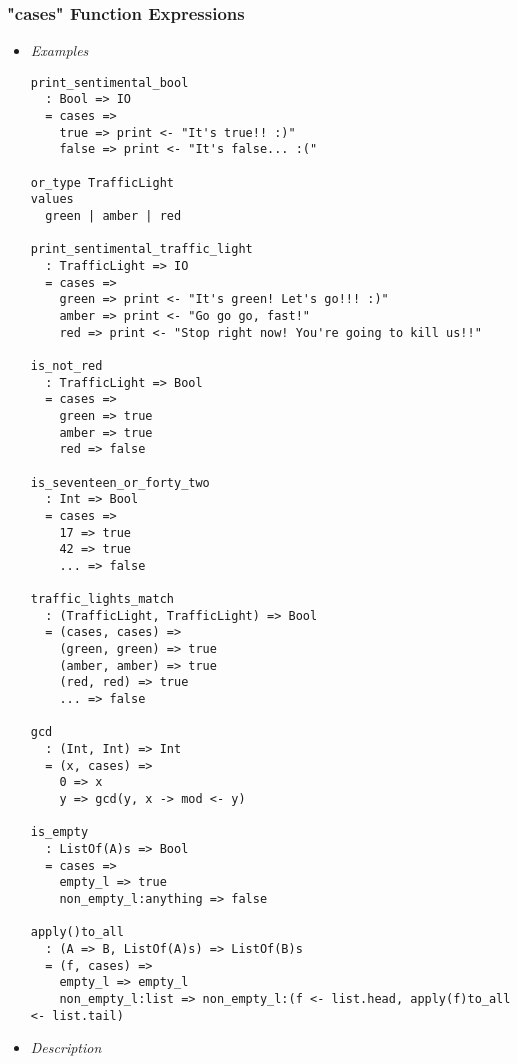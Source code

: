 \documentclass{article}
\begin{document}
\subsubsection{"cases" Function Expressions}
\label{subsubsec:casessyntax}

\begin{itemize}
\item \textit{Examples}

\begin{verbatim}
print_sentimental_bool
  : Bool => IO
  = cases =>
    true => print <- "It's true!! :)"
    false => print <- "It's false... :("

or_type TrafficLight
values
  green | amber | red

print_sentimental_traffic_light
  : TrafficLight => IO
  = cases =>
    green => print <- "It's green! Let's go!!! :)"
    amber => print <- "Go go go, fast!"
    red => print <- "Stop right now! You're going to kill us!!"

is_not_red
  : TrafficLight => Bool
  = cases =>
    green => true
    amber => true
    red => false

is_seventeen_or_forty_two
  : Int => Bool
  = cases => 
    17 => true
    42 => true
    ... => false
 
traffic_lights_match
  : (TrafficLight, TrafficLight) => Bool
  = (cases, cases) =>
    (green, green) => true
    (amber, amber) => true
    (red, red) => true
    ... => false

gcd
  : (Int, Int) => Int
  = (x, cases) =>
    0 => x
    y => gcd(y, x -> mod <- y) 

is_empty
  : ListOf(A)s => Bool
  = cases => 
    empty_l => true
    non_empty_l:anything => false

apply()to_all
  : (A => B, ListOf(A)s) => ListOf(B)s
  = (f, cases) =>
    empty_l => empty_l
    non_empty_l:list => non_empty_l:(f <- list.head, apply(f)to_all <- list.tail)

\end{verbatim}

\item \textit{Description}


\end{itemize}
\end{document}
